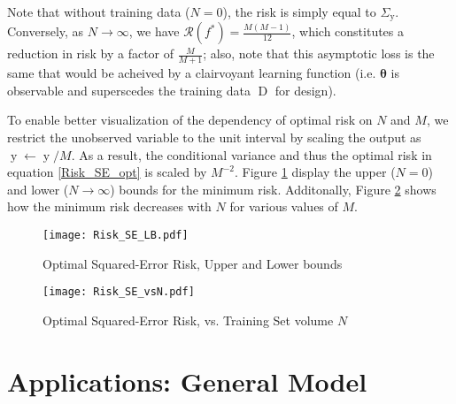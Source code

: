 \documentclass[12pt]{report}
\DeclareMathOperator{\yrm}{\mathrm{y}}
\DeclareMathOperator{\Drm}{\mathrm{D}}
\begin{document}
Note that without training data ($N=0$), the risk is simply equal to $\Sigma_{\yrm}$. Conversely, as $N \to \infty$, we have $\mathcal{R}(f^*) = \frac{M(M-1)}{12}$, which constitutes a reduction in risk by a factor of $\frac{M}{M+1}$; also, note that this asymptotic loss is the same that would be acheived by a clairvoyant learning function (i.e. $\bm{\theta}$ is observable and superscedes the training data $\Drm$ for design).

To enable better visualization of the dependency of optimal risk on $N$ and $M$, we restrict the unobserved variable to the unit interval by scaling the output as $\yrm \gets \yrm/M$. As a result, the conditional variance and thus the optimal risk in equation \eqref{Risk_SE_opt} is scaled by $M^{-2}$. Figure \ref{fig:Risk_SE_LB} display the upper ($N=0$) and lower ($N \to \infty$) bounds for the minimum risk. Additonally, Figure \ref{fig:Risk_SE_vsN} shows how the minimum risk decreases with $N$ for various values of $M$.


\begin{figure}
\centering
\texttt{[image: Risk\_SE\_LB.pdf]}
\caption{Optimal Squared-Error Risk, Upper and Lower bounds}
\label{fig:Risk_SE_LB}
\end{figure}

\begin{figure}
\centering
\texttt{[image: Risk\_SE\_vsN.pdf]}
\caption{Optimal Squared-Error Risk, vs. Training Set volume $N$}
\label{fig:Risk_SE_vsN}
\end{figure}











\section{Applications: General Model}
\end{document}
